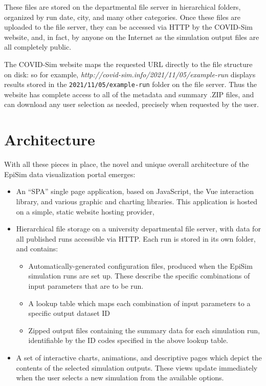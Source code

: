 These files are stored on the departmental file server in hierarchical folders, organized by run date, city, and many other categories. Once these files are uploaded to the file server, they can be accessed via HTTP by the COVID-Sim website, and, in fact, by anyone on the Internet as the simulation output files are all completely public.

The COVID-Sim website maps the requested URL directly to the file structure on disk: so for example, \emph{http://covid-sim.info/2021/11/05/example-run} displays results stored in the \texttt{2021/11/05/example-run} folder on the file server. Thus the website has complete access to all of the metadata and summary .ZIP files, and can download any user selection as needed, precisely when requested by the user.

\hypertarget{covid-architecture}{%
\section{Architecture}\label{architecture}}

With all these pieces in place, the novel and unique overall architecture of the EpiSim data visualization portal emerges:

\begin{itemize}
\item
  An ``SPA'' single page application, based on JavaScript, the Vue interaction library, and various graphic and charting libraries. This application is hosted on a simple, static website hosting provider,
\item
  Hierarchical file storage on a university departmental file server,
  with data for all published runs accessible via HTTP. Each run is
  stored in its own folder, and contains:

  \begin{itemize}
  \item
    Automatically-generated configuration files, produced when the
    EpiSim simulation runs are set up. These describe the specific
    combinations of input parameters that are to be run.
  \item
    A lookup table which maps each combination of input parameters to a
    specific output dataset ID
  \item
    Zipped output files containing the summary data for each simulation
    run, identifiable by the ID codes specified in the above lookup table.
  \end{itemize}
\item
  A set of interactive charts, animations, and descriptive pages which depict the
  contents of the selected simulation outputs. These views update immediately when
  the user selects a new simulation from the available options.
\end{itemize}

